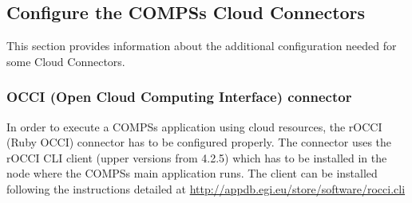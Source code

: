 \subsection{Configure the COMPSs Cloud Connectors}
This section provides information about the additional configuration needed for some Cloud Connectors.

\subsubsection{OCCI (Open Cloud Computing Interface) connector}
In order to execute a COMPSs application using cloud resources, the rOCCI (Ruby OCCI) connector has to be configured properly.
The connector uses the rOCCI CLI client (upper versions from 4.2.5) which has to be installed in the node where the COMPSs main
application runs. The client can be installed following the instructions detailed at 
\url{http://appdb.egi.eu/store/software/rocci.cli}